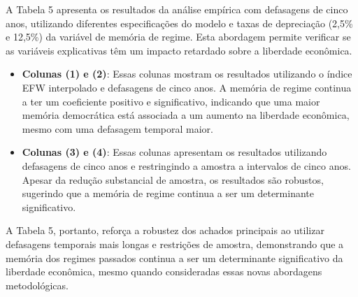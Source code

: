 		A Tabela 5 apresenta os resultados da análise empírica com defasagens de cinco anos, utilizando diferentes especificações do modelo e taxas de depreciação (2,5\% e 12,5\%) da variável de memória de regime. Esta abordagem permite verificar se as variáveis explicativas têm um impacto retardado sobre a liberdade econômica.

		\begin{itemize}
			\item \textbf{Colunas (1) e (2)}: Essas colunas mostram os resultados utilizando o índice EFW interpolado e defasagens de cinco anos. A memória de regime continua a ter um coeficiente positivo e significativo, indicando que uma maior memória democrática está associada a um aumento na liberdade econômica, mesmo com uma defasagem temporal maior.
			\item \textbf{Colunas (3) e (4)}: Essas colunas apresentam os resultados utilizando defasagens de cinco anos e restringindo a amostra a intervalos de cinco anos. Apesar da redução substancial de amostra, os resultados são robustos, sugerindo que a memória de regime continua a ser um determinante significativo.
		\end{itemize}
		
		A Tabela 5, portanto, reforça a robustez dos achados principais ao utilizar defasagens temporais mais longas e restrições de amostra, demonstrando que a memória dos regimes passados continua a ser um determinante significativo da liberdade econômica, mesmo quando consideradas essas novas abordagens metodológicas.
		

